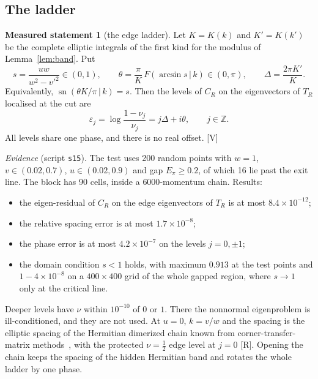 \documentclass[11pt]{article}
\theoremstyle{definition}
\newtheorem{statement}[theorem]{Measured statement}
\newcommand{\grade}[1]{\textsf{\small[#1]}}
\newcommand{\sn}{\operatorname{sn}}
\begin{document}
\subsection{The ladder}
\begin{statement}[the edge ladder]\label{st:ladder}
Let $K=K(k)$ and $K'=K(k')$ be the complete elliptic integrals of the first kind for the modulus of Lemma~\ref{lem:band}. Put
\[
s=\frac{uw}{w^2-v'^2}\in(0,1),\qquad \theta=\frac{\pi}{K}\,F(\arcsin s\,|\,k)\in(0,\pi),\qquad \Delta=\frac{2\pi K'}{K}.
\]
Equivalently, $\sn(\theta K/\pi\,|\,k)=s$. Then the levels of $C_R$ on the eigenvectors of $T_R$ localised at the cut are
\[
\varepsilon_j=\log\frac{1-\nu_j}{\nu_j}=j\Delta+i\theta,\qquad j\in\mathbb Z.
\]
All levels share one phase, and there is no real offset. \grade{V}
\end{statement}
\noindent\emph{Evidence} (script \texttt{s15}). The test uses 200 random points with $w=1$, $v\in(0.02,0.7)$, $u\in(0.02,0.9)$ and gap $E_\pi\ge0.2$, of which 16 lie past the exit line. The block has 90 cells, inside a $6000$-momentum chain. Results:
\begin{itemize}
\item the eigen-residual of $C_R$ on the edge eigenvectors of $T_R$ is at most $8.4\times10^{-12}$;
\item the relative spacing error is at most $1.7\times10^{-8}$;
\item the phase error is at most $4.2\times10^{-7}$ on the levels $j=0,\pm1$;
\item the domain condition $s<1$ holds, with maximum $0.913$ at the test points and $1-4\times10^{-8}$ on a $400\times400$ grid of the whole gapped region, where $s\to1$ only at the critical line.
\end{itemize}
Deeper levels have $\nu$ within $10^{-10}$ of $0$ or $1$. There the nonnormal eigenproblem is ill-conditioned, and they are not used. At $u=0$, $k=v/w$ and the spacing is the elliptic spacing of the Hermitian dimerized chain known from corner-transfer-matrix methods~\cite{peschel04,peschelEisler09}, with the protected $\nu=\tfrac12$ edge level at $j=0$ \grade{R}. Opening the chain keeps the spacing of the hidden Hermitian band and rotates the whole ladder by one phase.
\end{document}
